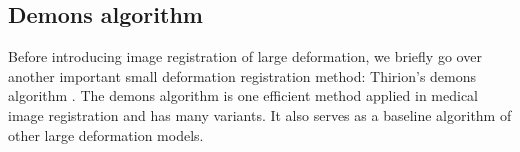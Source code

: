 \documentclass[letterpaper,12pt]{article}
\begin{document}


\subsection{Demons algorithm}
\label{sec:demons}

Before introducing image registration of large deformation, we briefly
go over another important small deformation registration method:
Thirion's demons algorithm \cite{Thirion98}.  The demons algorithm is
one efficient method applied in medical image
registration and has many variants. It also serves as a baseline algorithm of other large deformation models. 
\end{document}
